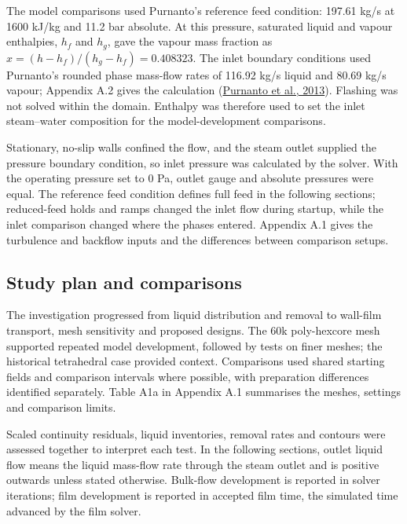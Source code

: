 \documentclass[12pt]{article}
\begin{document}
The model comparisons used Purnanto's reference feed condition: 197.61 kg/s at 1600 kJ/kg and 11.2 bar absolute. At this pressure, saturated liquid and vapour enthalpies, \(h_f\) and \(h_g\), gave the vapour mass fraction as \(x=(h-h_f)/(h_g-h_f)=0.408323\). The inlet boundary conditions used Purnanto's rounded phase mass-flow rates of 116.92 kg/s liquid and 80.69 kg/s vapour; Appendix A.2 gives the calculation (\href{https://www.researchgate.net/publication/269519626_CFD_MODELLING_OF_TWO-PHASE_FLOW_INSIDE_GEOTHERMAL_STEAM-WATER_SEPARATORS}{Purnanto et al., 2013}). Flashing was not solved within the domain. Enthalpy was therefore used to set the inlet steam--water composition for the model-development comparisons.

Stationary, no-slip walls confined the flow, and the steam outlet supplied the pressure boundary condition, so inlet pressure was calculated by the solver. With the operating pressure set to 0 Pa, outlet gauge and absolute pressures were equal. The reference feed condition defines full feed in the following sections; reduced-feed holds and ramps changed the inlet flow during startup, while the inlet comparison changed where the phases entered. Appendix A.1 gives the turbulence and backflow inputs and the differences between comparison setups.

\subsection{Study plan and comparisons}\label{study-plan-and-comparisons}

The investigation progressed from liquid distribution and removal to wall-film transport, mesh sensitivity and proposed designs. The 60k poly-hexcore mesh supported repeated model development, followed by tests on finer meshes; the historical tetrahedral case provided context. Comparisons used shared starting fields and comparison intervals where possible, with preparation differences identified separately. Table A1a in Appendix A.1 summarises the meshes, settings and comparison limits.

Scaled continuity residuals, liquid inventories, removal rates and contours were assessed together to interpret each test. In the following sections, outlet liquid flow means the liquid mass-flow rate through the steam outlet and is positive outwards unless stated otherwise. Bulk-flow development is reported in solver iterations; film development is reported in accepted film time, the simulated time advanced by the film solver.
\end{document}
